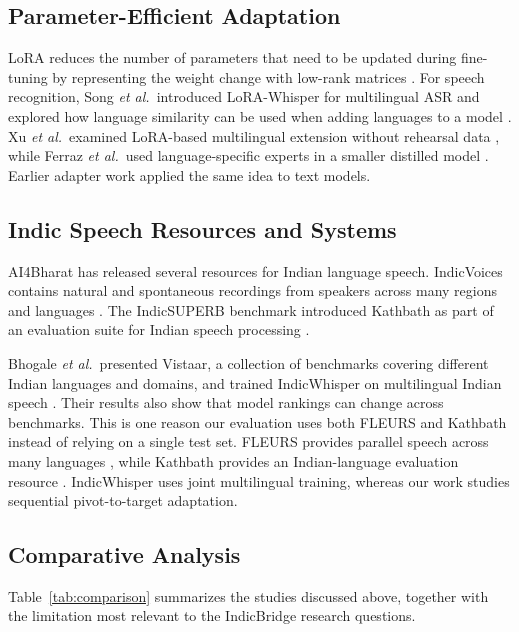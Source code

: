 \documentclass[conference]{IEEEtran}
\begin{document}
\subsection{Parameter-Efficient Adaptation}

LoRA reduces the number of parameters that need to be updated during
fine-tuning by representing the weight change with low-rank matrices
\cite{hu2022lora}. For speech recognition, Song \emph{et al.}\ introduced
LoRA-Whisper for multilingual ASR and explored how language similarity
can be used when adding languages to a model \cite{song2024lorawhisper}.
Xu \emph{et al.}\ examined LoRA-based multilingual extension without
rehearsal data \cite{xu2024rehearsalfree}, while Ferraz \emph{et al.}\
used language-specific experts in a smaller distilled model
\cite{ferraz2024distilwhisper}. Earlier adapter work
\cite{houlsby2019adapters,pfeiffer2020madx} applied the same idea to
text models.

\subsection{Indic Speech Resources and Systems}

AI4Bharat has released several resources for Indian language speech.
IndicVoices contains natural and spontaneous recordings from speakers
across many regions and languages \cite{javed2024indicvoices}. The
IndicSUPERB benchmark introduced Kathbath as part of an evaluation suite
for Indian speech processing \cite{javed2023indicsuperb}.

Bhogale \emph{et al.}\ presented Vistaar, a collection of benchmarks
covering different Indian languages and domains, and trained
IndicWhisper on multilingual Indian speech \cite{bhogale2023vistaar}.
Their results also show that model rankings can change across benchmarks.
This is one reason our evaluation uses both FLEURS and Kathbath instead
of relying on a single test set. FLEURS provides parallel speech across
many languages \cite{conneau2023fleurs}, while Kathbath provides an
Indian-language evaluation resource \cite{javed2023indicsuperb}.
IndicWhisper uses joint multilingual training, whereas our work studies
sequential pivot-to-target adaptation.

\subsection{Comparative Analysis}

Table~\ref{tab:comparison} summarizes the studies discussed above,
together with the limitation most relevant to the IndicBridge research
questions.
\end{document}
